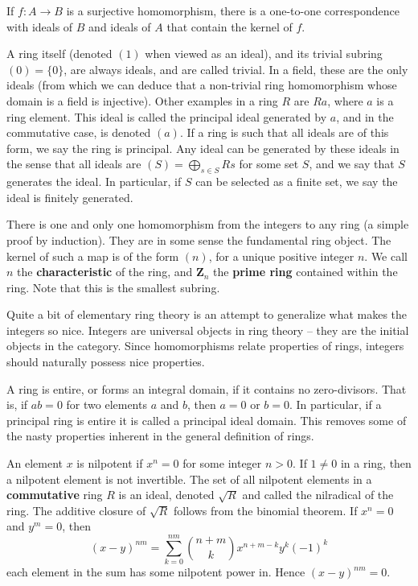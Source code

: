 \begin{theorem}
    If $f:A \to B$ is a surjective homomorphism, there is a one-to-one correspondence with ideals of $B$ and ideals of $A$ that contain the kernel of $f$.
\end{theorem}

A ring itself (denoted $(1)$ when viewed as an ideal), and its trivial subring $(0) = \{ 0 \}$, are always ideals, and are called trivial. In a field, these are the only ideals (from which we can deduce that a non-trivial ring homomorphism whose domain is a field is injective). Other examples in a ring $R$ are $Ra$, where $a$ is a ring element. This ideal is called the principal ideal generated by $a$, and in the commutative case, is denoted $(a)$. If a ring is such that all ideals are of this form, we say the ring is principal. Any ideal can be generated by these ideals in the sense that all ideals are $(S) = \bigoplus_{s \in S} Rs$ for some set $S$, and we say that $S$ generates the ideal. In particular, if $S$ can be selected as a finite set, we say the ideal is finitely generated.

There is one and only one homomorphism from the integers to any ring (a simple proof by induction). They are in some sense the fundamental ring object. The kernel of such a map is of the form $(n)$, for a unique positive integer $n$. We call $n$ the {\bf characteristic} of the ring, and $\mathbf{Z}_n$ the {\bf prime ring} contained within the ring. Note that this is the smallest subring.

Quite a bit of elementary ring theory is an attempt to generalize what makes the integers so nice. Integers are universal objects in ring theory -- they are the initial objects in the category. Since homomorphisms relate properties of rings, integers should naturally possess nice properties.

A ring is entire, or forms an integral domain, if it contains no zero-divisors. That is, if $ab = 0$ for two elements $a$ and $b$, then $a = 0$ or $b = 0$. In particular, if a principal ring is entire it is called a principal ideal domain. This removes some of the nasty properties inherent in the general definition of rings.

An element $x$ is nilpotent if $x^n = 0$ for some integer $n > 0$. If $1 \neq 0$ in a ring, then a nilpotent element is not invertible. The set of all nilpotent elements in a {\bf commutative} ring $R$ is an ideal, denoted $\sqrt{R}$ and called the nilradical of the ring. The additive closure of $\sqrt{R}$ follows from the binomial theorem. If $x^n = 0$ and $y^m = 0$, then
%
\[ (x - y)^{nm} = \sum_{k = 0}^{nm} \binom{n + m}{k} x^{n + m - k}y^k (-1)^k \]
%
each element in the sum has some nilpotent power in. Hence $(x - y)^{nm} = 0$.

